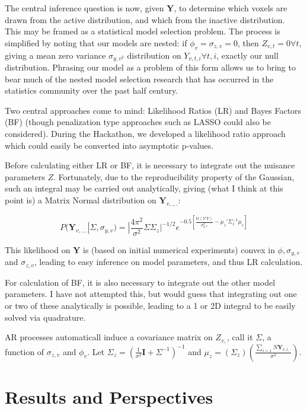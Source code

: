 \documentclass[a4paper]{article}
\begin{document}
The central inference question is now, given $\mathbf{Y}$, to determine which voxels are drawn from the active distribution, and which from the inactive distribution. This may be framed as a statistical model selection problem. The process is simplified by noting that our models are nested: if $\phi_v = \sigma_{z,v} = 0$, then $Z_{v,t} = 0 \forall t$, giving a mean zero variance $\sigma_{{y,v}^2}$  distribution on $Y_{v,t,i} \forall t,i$, exactly our null distribution. Phrasing our model as a problem of this form allows us to bring to bear much of the nested model selection research that has occurred in the statistics community over the past half century. 

Two central approaches come to mind: Likelihood Ratios (LR) and Bayes Factors (BF) (though penalization type approaches such as LASSO could also be considered). During the Hackathon, we developed a likelihood ratio approach which could easily be converted into asymptotic p-values. 

Before calculating either LR or BF, it is necessary to integrate out the nuisance parameters $Z$. Fortunately, due to the reproducibility property of the Gaussian, such an integral may be carried out analytically, giving (what I think at this point is) a Matrix Normal distribution on $\mathbf{Y}_{v,.,.}$:

$$
P(\mathbf{Y}_{v,.,.} | \Sigma, \sigma_{y,v}) = 
|\frac{4 \pi^2}{\sigma^2}\Sigma \Sigma_z|^{-1/2}
e^{-0.5[\frac{\textrm{tr}(Y'Y)}{\sigma^2_{y,v}} - \mu_z'\Sigma_z^{-1}\mu_z]}
$$

This likelihood on $\mathbf{Y}$ is (based on initial numerical experiments) convex in $\phi, \sigma_{y,v}$ and $\sigma_{z,v}$, leading to easy inference on model parameters, and thus LR calculation.

For calculation of BF, it is also necessary to integrate out the other model parameters. I have not attempted this, but would guess that integrating out one or two of these analytically is possible, leading to a 1 or 2D integral to be easily solved via quadrature.

AR processes automaticall induce a covariance matrix on $Z_{v,}$, call it $\Sigma$, a function of $\sigma_{z,v}$ and $\phi_v$. Let $\Sigma_z = (\frac{1}{\sigma^2} \mathbf{I} + \Sigma^{-1})^{-1}$ and $\mu_z = (\Sigma_z)(\frac{\sum_{i=1}{N}\mathbf{Y}_{v,i,.}}{\sigma^2})$.

\section{Results and Perspectives}
\end{document}
